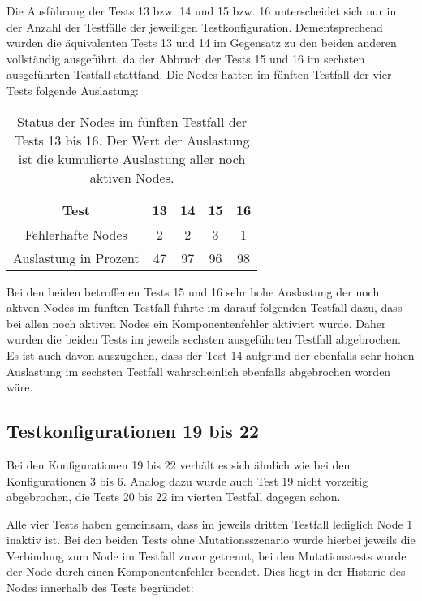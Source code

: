 Die Ausführung der Tests 13 bzw. 14 und 15 bzw. 16 unterscheidet sich nur in der Anzahl der Testfälle der jeweiligen Testkonfiguration.
Dementsprechend wurden die äquivalenten Tests 13 und 14 im Gegensatz zu den beiden anderen vollständig ausgeführt, da der Abbruch der Tests 15 und 16 im sechsten ausgeführten Testfall stattfand.
Die Nodes hatten im fünften Testfall der vier Tests folgende Auslastung:

\begin{table}[h]
    \begin{tabular}{c|cccc}
    	        Test          & 13 & 14 & 15 & 16 \\ \hline
    	  Fehlerhafte Nodes   & 2  & 2  & 3  & 1  \\
    	Auslastung in Prozent & 47 & 97 & 96 & 98
    \end{tabular}
    \caption[Status der Nodes im fünften Testfall der Tests 13 bis 16]
        {Status der Nodes im fünften Testfall der Tests 13 bis 16.
        Der Wert der Auslastung ist die kumulierte Auslastung aller noch aktiven Nodes.}
    \label{tab:loadTests1316}
\end{table}

Bei den beiden betroffenen Tests 15 und 16 sehr hohe Auslastung der noch aktven Nodes im fünften Testfall führte im darauf folgenden Testfall dazu, dass bei allen noch aktiven Nodes ein Komponentenfehler aktiviert wurde.
Daher wurden die beiden Tests im jeweils sechsten ausgeführten Testfall abgebrochen.
Es ist auch davon auszugehen, dass der Test 14 aufgrund der ebenfalls sehr hohen Auslastung im sechsten Testfall wahrscheinlich ebenfalls abgebrochen worden wäre.

\subsection{Testkonfigurationen 19 bis 22}
\label{sec:noReconf1922}

Bei den Konfigurationen 19 bis 22 verhält es sich ähnlich wie bei den Konfigurationen 3 bis 6.
Analog dazu wurde auch Test 19 nicht vorzeitig abgebrochen, die Tests 20 bis 22 im vierten Testfall dagegen schon.

Alle vier Tests haben gemeinsam, dass im jeweils dritten Testfall lediglich Node 1 inaktiv ist.
Bei den beiden Tests ohne Mutationsszenario wurde hierbei jeweils die Verbindung zum Node im Testfall zuvor getrennt, bei den Mutationstests wurde der Node durch einen Komponentenfehler beendet.
Dies liegt in der Historie des Nodes innerhalb des Tests begründet:

